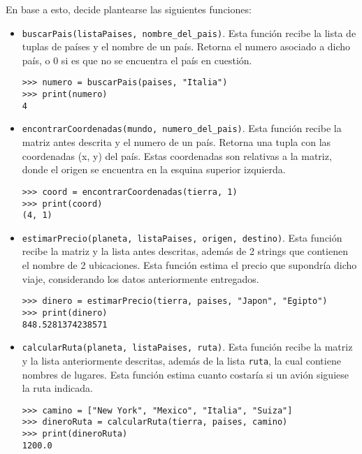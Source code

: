 En base a esto, decide plantearse las siguientes funciones:

\begin{itemize}
    \item \texttt{buscarPais(listaPaises, nombre\_del\_pais)}. Esta función recibe la lista de tuplas de países y el nombre de un país. Retorna el numero asociado a dicho país, o 0 si es que no se encuentra el país en cuestión.

\begin{lstlisting}[style=consola]
>>> numero = buscarPais(paises, "Italia")
>>> print(numero)
4
\end{lstlisting}

    \item \texttt{encontrarCoordenadas(mundo, numero\_del\_pais)}. Esta función recibe la matriz antes descrita y el numero de un país. Retorna una tupla con las coordenadas (x, y) del país. Estas coordenadas son relativas a la matriz, donde el origen se encuentra en la esquina superior izquierda.

\begin{lstlisting}[style=consola]
>>> coord = encontrarCoordenadas(tierra, 1)
>>> print(coord)
(4, 1)
\end{lstlisting}

    \item \texttt{estimarPrecio(planeta, listaPaises, origen, destino)}. Esta función recibe la matriz y la lista antes descritas, además de 2 strings que contienen el nombre de 2 ubicaciones. Esta función estima el precio que supondría dicho viaje, considerando los datos anteriormente entregados.

\begin{lstlisting}[style=consola]
>>> dinero = estimarPrecio(tierra, paises, "Japon", "Egipto")
>>> print(dinero)
848.5281374238571
\end{lstlisting}

    \item \texttt{calcularRuta(planeta, listaPaises, ruta)}. Esta función recibe la matriz y la lista anteriormente descritas, además de la lista \texttt{ruta}, la cual contiene nombres de lugares. Esta función estima cuanto costaría si un avión siguiese la ruta indicada.

\begin{lstlisting}[style=consola]
>>> camino = ["New York", "Mexico", "Italia", "Suiza"]
>>> dineroRuta = calcularRuta(tierra, paises, camino)
>>> print(dineroRuta)
1200.0
\end{lstlisting}

\end{itemize}
